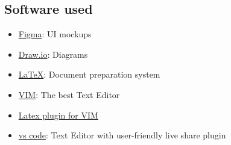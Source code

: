 \documentclass{article}
\begin{document}
\subsection{Software used}
\begin{itemize}
	\item \href{https://www.figma.com/}{Figma}: UI mockups
	\item \href{https://www.draw.io/}{Draw.io}: Diagrams
	\item \href{https://www.latex-project.org/}{LaTeX}: Document preparation system 
	\item \href{https://www.vim.org/}{VIM}: The best Text Editor
	\item \href{https://github.com/xuhdev/vim-latex-live-preview}{Latex plugin for VIM}
	\item \href{https://code.visualstudio.com/}{vs code}: Text Editor with user-friendly live share plugin
\end{itemize} 
\end{document}
